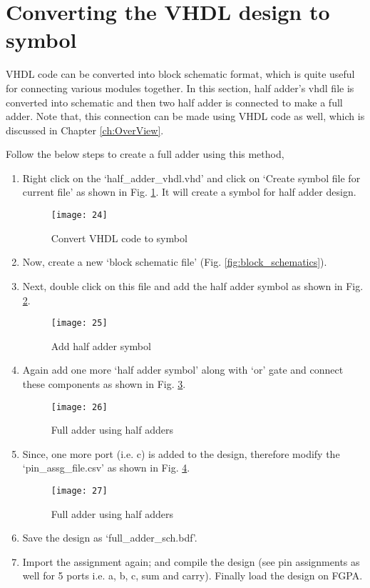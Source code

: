 \section{Converting the VHDL design to symbol} \label{sec:vhdl_to_symbol}
VHDL code can be converted into block schematic format,  which is quite useful for connecting various modules together. In this section, half adder's vhdl file is converted into schematic and then two half adder is connected to make a full adder. Note that, this connection can be made using VHDL code as well, which is discussed in Chapter \ref{ch:OverView}. 

Follow the below steps to create a full adder using this method,


\begin{enumerate}
	\item Right click on the `half\_adder\_vhdl.vhd' and click on `Create symbol file for current file' as shown in Fig. \ref{fig:vhdl_to_symbol}. It will create a symbol for half adder design. 
	
	\begin{figure}
		\centering
		\texttt{[image: 24]}
		\caption{Convert VHDL code to symbol}
		\label{fig:vhdl_to_symbol}
	\end{figure}
	\item Now, create a new `block schematic file' (Fig. \ref{fig:block_schematics}). 
	\item Next, double click on this file and add the half adder symbol as shown in Fig. \ref{fig:ha_symbol}.
	
	\begin{figure}
		\centering
		\texttt{[image: 25]}
		\caption{Add half adder symbol}
		\label{fig:ha_symbol}
	\end{figure}
	\item Again add one more `half adder symbol' along with `or' gate and connect these components as shown in Fig. \ref{fig:fa_design}. 
	
	\begin{figure}
		\centering
		\texttt{[image: 26]}
		\caption{Full adder using half adders}
		\label{fig:fa_design}
	\end{figure}
	
	\item Since, one more port (i.e. c) is added to the design, therefore modify the `pin\_assg\_file.csv' as shown in Fig. \ref{fig:update_pin_assg}. 
	
	\begin{figure}
		\centering
		\texttt{[image: 27]}
		\caption{Full adder using half adders}
		\label{fig:update_pin_assg}
	\end{figure}
	\item Save the design as `full\_adder\_sch.bdf'. 
	\item Import the assignment again; and compile the design (see pin assignments as well for 5 ports i.e. a, b, c, sum and carry). Finally load the design on FGPA. 
\end{enumerate}

